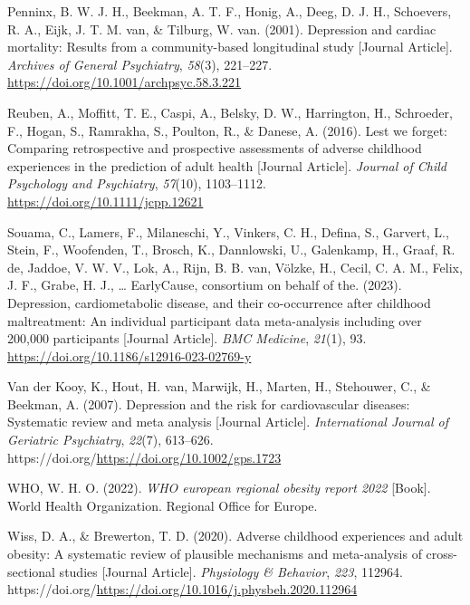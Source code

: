 \documentclass[
  letterpaper,
  DIV=11,
  numbers=noendperiod]{scrreport}
\newlength{\cslhangindent}
\newenvironment{CSLReferences}[2] %
 {\begin{list}{}{%
  \setlength{\itemindent}{0pt}
  \setlength{\leftmargin}{0pt}
  \setlength{\parsep}{0pt}
  \ifodd #1
   \setlength{\leftmargin}{\cslhangindent}
   \setlength{\itemindent}{-1\cslhangindent}
  \fi
  \setlength{\itemsep}{#2\baselineskip}}}
 {\end{list}}
\begin{document}
\begin{CSLReferences}{1}{0}
Penninx, B. W. J. H., Beekman, A. T. F., Honig, A., Deeg, D. J. H.,
Schoevers, R. A., Eijk, J. T. M. van, \& Tilburg, W. van. (2001).
Depression and cardiac mortality: Results from a community-based
longitudinal study {[}Journal Article{]}. \emph{Archives of General
Psychiatry}, \emph{58}(3), 221--227.
\url{https://doi.org/10.1001/archpsyc.58.3.221}

Reuben, A., Moffitt, T. E., Caspi, A., Belsky, D. W., Harrington, H.,
Schroeder, F., Hogan, S., Ramrakha, S., Poulton, R., \& Danese, A.
(2016). Lest we forget: Comparing retrospective and prospective
assessments of adverse childhood experiences in the prediction of adult
health {[}Journal Article{]}. \emph{Journal of Child Psychology and
Psychiatry}, \emph{57}(10), 1103--1112.
\url{https://doi.org/10.1111/jcpp.12621}

Souama, C., Lamers, F., Milaneschi, Y., Vinkers, C. H., Defina, S.,
Garvert, L., Stein, F., Woofenden, T., Brosch, K., Dannlowski, U.,
Galenkamp, H., Graaf, R. de, Jaddoe, V. W. V., Lok, A., Rijn, B. B. van,
Völzke, H., Cecil, C. A. M., Felix, J. F., Grabe, H. J., \ldots{}
EarlyCause, consortium on behalf of the. (2023). Depression,
cardiometabolic disease, and their co-occurrence after childhood
maltreatment: An individual participant data meta-analysis including
over 200,000 participants {[}Journal Article{]}. \emph{BMC Medicine},
\emph{21}(1), 93. \url{https://doi.org/10.1186/s12916-023-02769-y}

Van der Kooy, K., Hout, H. van, Marwijk, H., Marten, H., Stehouwer, C.,
\& Beekman, A. (2007). Depression and the risk for cardiovascular
diseases: Systematic review and meta analysis {[}Journal Article{]}.
\emph{International Journal of Geriatric Psychiatry}, \emph{22}(7),
613--626. https://doi.org/\url{https://doi.org/10.1002/gps.1723}

WHO, W. H. O. (2022). \emph{WHO european regional obesity report 2022}
{[}Book{]}. World Health Organization. Regional Office for Europe.

Wiss, D. A., \& Brewerton, T. D. (2020). Adverse childhood experiences
and adult obesity: A systematic review of plausible mechanisms and
meta-analysis of cross-sectional studies {[}Journal Article{]}.
\emph{Physiology \& Behavior}, \emph{223}, 112964.
https://doi.org/\url{https://doi.org/10.1016/j.physbeh.2020.112964}


\end{CSLReferences}
\end{document}
